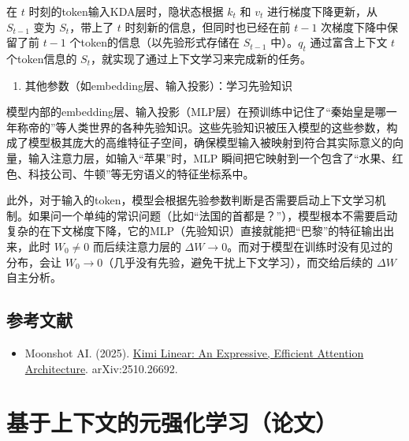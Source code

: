 在 \(t\) 时刻的token输入KDA层时，隐状态根据 \(k_t\) 和 \(v_t\) 进行梯度下降更新，从 \(S_{t-1}\) 变为 \(S_t\)，带上了 \(t\) 时刻新的信息，但同时也已经在前 \(t-1\) 次梯度下降中保留了前 \(t-1\) 个token的信息（以先验形式存储在 \(S_{t-1}\) 中）。\(q_t\) 通过富含上下文 \(t\) 个token信息的 \(S_t\)，就实现了通过上下文学习来完成新的任务。

\begin{enumerate}
\def\labelenumi{\arabic{enumi}.}
\setcounter{enumi}{2}
\tightlist
\item
  其他参数（如embedding层、输入投影）：学习先验知识
\end{enumerate}

模型内部的embedding层、输入投影（MLP层）在预训练中记住了``秦始皇是哪一年称帝的''等人类世界的各种先验知识。这些先验知识被压入模型的这些参数，构成了模型极其庞大的高维特征子空间，确保模型输入被映射到符合其实际意义的向量，输入注意力层，如输入``苹果''时，MLP 瞬间把它映射到一个包含了``水果、红色、科技公司、牛顿''等无穷语义的特征坐标系中。

此外，对于输入的token，模型会根据先验参数判断是否需要启动上下文学习机制。如果问一个单纯的常识问题（比如``法国的首都是？''），模型根本不需要启动复杂的在下文梯度下降，它的MLP（先验知识）直接就能把``巴黎''的特征输出出来，此时 \(W_0\ne 0\) 而后续注意力层的 \(\Delta W\to 0\)。而对于模型在训练时没有见过的分布，会让 \(W_0\to 0\)（几乎没有先验，避免干扰上下文学习），而交给后续的 \(\Delta W\) 自主分析。

\hypertarget{ux53c2ux8003ux6587ux732e-137}{%
\subsection{参考文献}\label{ux53c2ux8003ux6587ux732e-137}}

\begin{itemize}
\tightlist
\item
  Moonshot AI. (2025). \href{https://arxiv.org/abs/2510.26692}{Kimi Linear: An Expressive, Efficient Attention Architecture}. arXiv:2510.26692.
\end{itemize}

\clearpage

\hypertarget{ux57faux4e8eux4e0aux4e0bux6587ux7684ux5143ux5f3aux5316ux5b66ux4e60ux8bbaux6587}{%
\section{基于上下文的元强化学习（论文）}\label{ux57faux4e8eux4e0aux4e0bux6587ux7684ux5143ux5f3aux5316ux5b66ux4e60ux8bbaux6587}}

